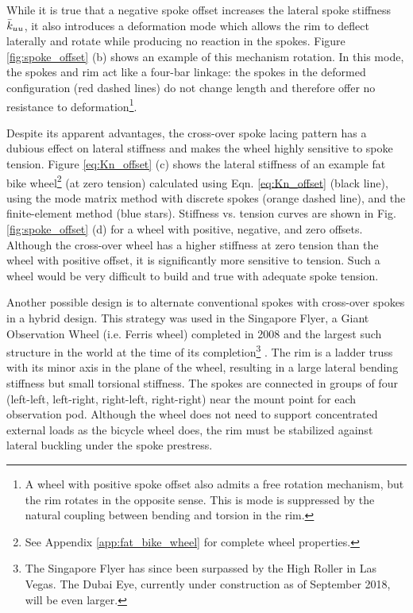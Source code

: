 \documentclass[\rootdir/thesis.tex]{subfiles}
\begin{document}
While it is true that a negative spoke offset increases the lateral spoke stiffness $\bar{k}_{uu}$, it also introduces a deformation mode which allows the rim to deflect laterally and rotate while producing no reaction in the spokes. Figure \ref{fig:spoke_offset} (b) shows an example of this mechanism rotation. In this mode, the spokes and rim act like a four-bar linkage: the spokes in the deformed configuration (red dashed lines) do not change length and therefore offer no resistance to deformation\footnote{A wheel with positive spoke offset also admits a free rotation mechanism, but the rim rotates in the opposite sense. This is mode is suppressed by the natural coupling between bending and torsion in the rim.}.

Despite its apparent advantages, the cross-over spoke lacing pattern has a dubious effect on lateral stiffness and makes the wheel highly sensitive to spoke tension. Figure \ref{eq:Kn_offset} (c) shows the lateral stiffness of an example fat bike wheel\footnote{See Appendix \ref{app:fat_bike_wheel} for complete wheel properties.} (at zero tension) calculated using Eqn. \eqref{eq:Kn_offset} (black line), using the mode matrix method with discrete spokes (orange dashed line), and the finite-element method (blue stars). Stiffness vs. tension curves are shown in Fig. \ref{fig:spoke_offset} (d) for a wheel with positive, negative, and zero offsets. Although the cross-over wheel has a higher stiffness at zero tension than the wheel with positive offset, it is significantly more sensitive to tension. Such a wheel would be very difficult to build and true with adequate spoke tension.

Another possible design is to alternate conventional spokes with cross-over spokes in a hybrid design. This strategy was used in the Singapore Flyer, a Giant Observation Wheel (i.e. Ferris wheel) completed in 2008 and the largest such structure in the world at the time of its completion\footnote{The Singapore Flyer has since been surpassed by the High Roller in Las Vegas. The Dubai Eye, currently under construction as of September 2018, will be even larger.} \cite{Allsop2009}. The rim is a ladder truss with its minor axis in the plane of the wheel, resulting in a large lateral bending stiffness but small torsional stiffness. The spokes are connected in groups of four (left-left, left-right, right-left, right-right) near the mount point for each observation pod. Although the wheel does not need to support concentrated external loads as the bicycle wheel does, the rim must be stabilized against lateral buckling under the spoke prestress.
\end{document}
